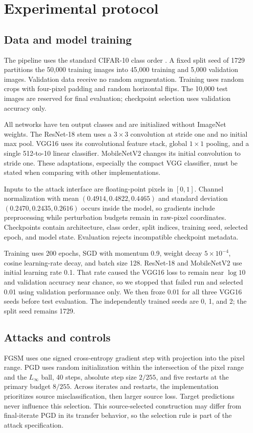 \documentclass[10pt,twocolumn]{article}
\begin{document}
\section{Experimental protocol}
\subsection{Data and model training}
The pipeline uses the standard CIFAR-10 class order \cite{cifar}. A fixed split seed of 1729 partitions the 50,000 training images into 45,000 training and 5,000 validation images. Validation data receive no random augmentation. Training uses random crops with four-pixel padding and random horizontal flips. The 10,000 test images are reserved for final evaluation; checkpoint selection uses validation accuracy only.

All networks have ten output classes and are initialized without ImageNet weights. The ResNet-18 stem uses a $3\times3$ convolution at stride one and no initial max pool. VGG16 uses its convolutional feature stack, global $1\times1$ pooling, and a single 512-to-10 linear classifier. MobileNetV2 changes its initial convolution to stride one. These adaptations, especially the compact VGG classifier, must be stated when comparing with other implementations.

Inputs to the attack interface are floating-point pixels in $[0,1]$. Channel normalization with mean $(0.4914,0.4822,0.4465)$ and standard deviation $(0.2470,0.2435,0.2616)$ occurs inside the model, so gradients include preprocessing while perturbation budgets remain in raw-pixel coordinates. Checkpoints contain architecture, class order, split indices, training seed, selected epoch, and model state. Evaluation rejects incompatible checkpoint metadata.

Training uses 200 epochs, SGD with momentum 0.9, weight decay $5\times10^{-4}$, cosine learning-rate decay, and batch size 128. ResNet-18 and MobileNetV2 use initial learning rate 0.1. That rate caused the VGG16 loss to remain near $\log 10$ and validation accuracy near chance, so we stopped that failed run and selected 0.01 using validation performance only. We then froze 0.01 for all three VGG16 seeds before test evaluation. The independently trained seeds are 0, 1, and 2; the split seed remains 1729.

\subsection{Attacks and controls}
FGSM uses one signed cross-entropy gradient step with projection into the pixel range. PGD uses random initialization within the intersection of the pixel range and the $L_\infty$ ball, 40 steps, absolute step size $2/255$, and five restarts at the primary budget $8/255$. Across iterates and restarts, the implementation prioritizes source misclassification, then larger source loss. Target predictions never influence this selection. This source-selected construction may differ from final-iterate PGD in its transfer behavior, so the selection rule is part of the attack specification.
\end{document}
